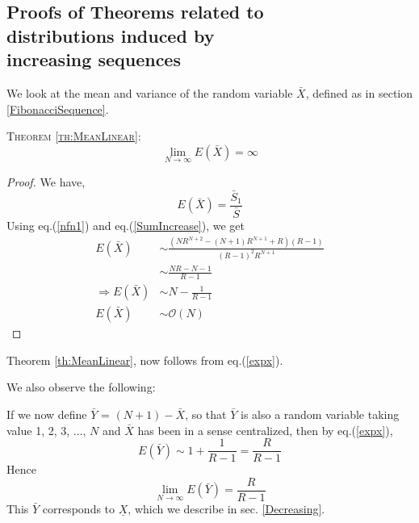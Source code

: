 \begin{multicols}{2}
\vspace{-.3cm}

\section{Proofs of Theorems related to\\ distributions induced by\\ increasing sequences}\label{section-6}

\vspace{-.2cm}

We look at the mean and variance of the random variable $\bar{X}$, defined as in section \ref{FibonacciSequence}.

\textsc{Theorem {\ref{th:MeanLinear}}:}
\begin{equation*}
\displaystyle{\lim_{N \rightarrow \infty}} E(\bar{X}) = \infty  
 \end{equation*}
\begin{proof}\renewcommand{\qedsymbol}{} 
We have,
\begin{equation}
E(\bar{X}) = \frac{\bar{S}_1}{\bar{S}}\label{eq-6.1}
\end{equation}
Using eq.(\ref{nfn1}) and eq.(\ref{SumIncrease}), we get
\begin{align}
E(\bar{X})&\sim \frac{(NR^{N+2}-(N+1)R^{N+1}+R)(R-1)}{(R-1)^2 R^{N+1}}\nonumber\\
&\sim \frac{NR-N-1}{R-1}\nonumber\\
\Rightarrow E(\bar{X}) &\sim N - \frac{1}{R-1}\\\label{eq-6.2}
\nonumber E(\bar{X}) &\sim \mathcal{O}(N)
\end{align}
\end{proof}

\vspace{-.7cm}

Theorem \ref{th:MeanLinear}, now follows from eq.(\ref{expx}).

We also observe the following: 

 If we now define $\bar Y$ = $(N+1)- \bar{X}$, so that $\bar{Y}$ is also a random variable taking value 1, 2, 3, $\ldots$, $N$ and $\bar{X}$ has been in a sense centralized, then by eq.(\ref{expx}),
 \begin{equation*}
 E(\bar{Y}) \sim 1 + \frac{1}{R-1} = \frac{R}{R-1}
 \end{equation*}
Hence 
\begin{equation*}
\displaystyle{\lim_{N \rightarrow \infty}} E(\bar{Y}) = \frac{R}{R-1} 
\end{equation*}
This $\bar{Y}$ corresponds to $\underline{X}$, which we describe in sec. \ref{Decreasing}.


\end{multicols}
